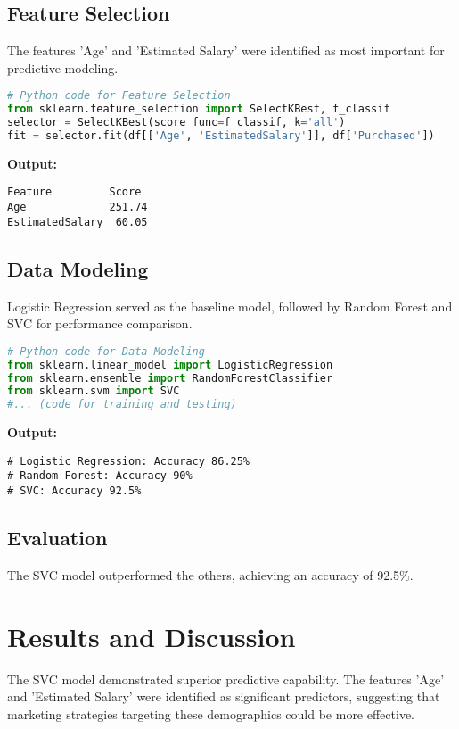 \documentclass[12pt]{article}
\begin{document}
\subsection{Feature Selection}
The features 'Age' and 'Estimated Salary' were identified as most important for predictive modeling.

\begin{lstlisting}[language=Python]
# Python code for Feature Selection
from sklearn.feature_selection import SelectKBest, f_classif
selector = SelectKBest(score_func=f_classif, k='all')
fit = selector.fit(df[['Age', 'EstimatedSalary']], df['Purchased'])
\end{lstlisting}

\textbf{Output:}
\begin{verbatim}
Feature         Score
Age             251.74
EstimatedSalary  60.05
\end{verbatim}

\subsection{Data Modeling}
Logistic Regression served as the baseline model, followed by Random Forest and SVC for performance comparison.

\begin{lstlisting}[language=Python]
# Python code for Data Modeling
from sklearn.linear_model import LogisticRegression
from sklearn.ensemble import RandomForestClassifier
from sklearn.svm import SVC
#... (code for training and testing)
\end{lstlisting}

\textbf{Output:}
\begin{verbatim}
# Logistic Regression: Accuracy 86.25%
# Random Forest: Accuracy 90%
# SVC: Accuracy 92.5%
\end{verbatim}

\subsection{Evaluation}
The SVC model outperformed the others, achieving an accuracy of 92.5\%.

\section{Results and Discussion}
The SVC model demonstrated superior predictive capability. The features 'Age' and 'Estimated Salary' were identified as significant predictors, suggesting that marketing strategies targeting these demographics could be more effective.
\end{document}
